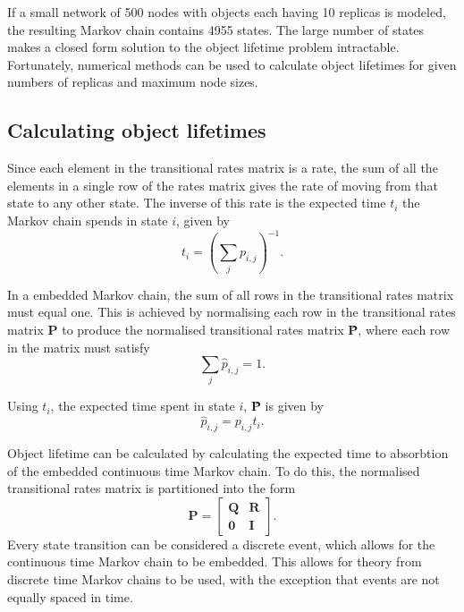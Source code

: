 If a small network of 500 nodes with objects each having 10 replicas is modeled, the resulting Markov chain contains 4955 states. The large number of states makes a closed form solution to the object lifetime problem intractable. Fortunately, numerical methods can be used to calculate object lifetimes for given numbers of replicas and maximum node sizes.

\subsection{Calculating object lifetimes}

Since each element in the transitional rates matrix is a rate, the sum of all the elements in a single row of the rates matrix gives the rate of moving from that state to any other state. The inverse of this rate is the expected time $t_i$ the Markov chain spends in state $i$, given by
%
\begin{equation} \label{eq_markov_rates}
    t_i = \left(\sum_{j} p_{i, j}\right)^{-1}.
\end{equation}

In a embedded Markov chain, the sum of all rows in the transitional rates matrix must equal one. This is achieved by normalising each row in the transitional rates matrix \textbf{P} to produce the normalised transitional rates matrix \textbf{\^{P}}, where each row in the matrix must satisfy
%
\begin{equation} \label{eq_markov_sum}
    \sum_{j} \hat{p}_{i, j} = 1.
\end{equation}

Using $t_i$, the expected time spent in state $i$, \textbf{\^{P}} is given by
%
\begin{equation} \label{eq_markov_normalisation}
    \hat{p}_{i, j} = p_{i, j} t_i.
\end{equation}

Object lifetime can be calculated by calculating the expected time to absorbtion of the embedded continuous time Markov chain. To do this, the normalised transitional rates matrix is partitioned into the form
%
\begin{equation} \label{matrix_partition}
    \textbf{\^{P}} = \left[\begin{array}{c|c}
                   \textbf{Q} & \textbf{R} \\
                   \hline
                   \textbf{0} & \textbf{I}
                 \end{array}\right].
\end{equation}
%
Every state transition can be considered a discrete event, which allows for the continuous time Markov chain to be embedded. This allows for theory from discrete time Markov chains to be used, with the exception that events are not equally spaced in time.

